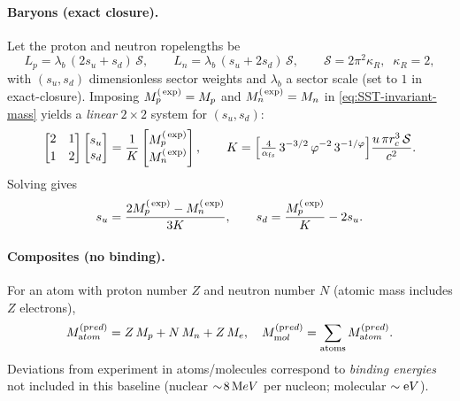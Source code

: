 \documentclass[reprint,aps,onecolumn,nofootinbib]{revtex4-2}
\begin{document}
    \paragraph{Baryons (exact closure).}
        Let the proton and neutron ropelengths be
        \[
            L_p=\lambda_b\,(2s_u+s_d)\,\mathcal S,\qquad
            L_n=\lambda_b\,(s_u+2s_d)\,\mathcal S,\qquad
            \mathcal S=2\pi^2\kappa_R,\;\;\kappa_R=2,
        \]
        with $(s_u,s_d)$ dimensionless sector weights and $\lambda_b$ a sector scale (set to $1$ in exact-closure).
        Imposing $M_p^{\textrm(\exp)}=M_p$ and $M_n^{\textrm(\exp)}=M_n$ in \eqref{eq:SST-invariant-mass} yields a \emph{linear} $2\times2$ system for $(s_u,s_d)$:
        \[
            \begin{bmatrix}
            2 & 1\\[2pt]
            1 & 2
            \end{bmatrix}
            \begin{bmatrix}
            s_u\\ s_d
            \end{bmatrix}

            =
            \frac{1}{K}
            \begin{bmatrix}
            M_p^{\textrm(\exp)}\\ M_n^{\textrm(\exp)}
            \end{bmatrix},
            \qquad
            K=\Big[\tfrac{4}{\alpha_{\textrm fs}}\,3^{-3/2}\,\varphi^{-2}\,3^{-1/\varphi}\Big]\frac{u\,\pi r_c^3\,\mathcal S}{c^2}.
        \]
        Solving gives
        \[
            s_u=\frac{2M_p^{\textrm(\exp)}-M_n^{\textrm(\exp)}}{3K},
            \qquad
            s_d=\frac{M_p^{\textrm(\exp)}}{K}-2s_u.
        \]

    \paragraph{Composites (no binding).}
        For an atom with proton number $Z$ and neutron number $N$ (atomic mass includes $Z$ electrons),
        \[
            M_{\textrm atom}^{(\textrm pred)} = Z\,M_p+N\,M_n+Z\,M_e,\quad
            M_{\textrm mol}^{(\textrm pred)}=\sum_{\text{atoms}}M_{\textrm atom}^{(\textrm pred)}.
        \]
        Deviations from experiment in atoms/molecules correspond to \emph{binding energies} not included in this baseline (nuclear $\sim\!8\,{\textrm MeV}$ per nucleon; molecular $\sim{\textrm eV}$).

\end{document}
